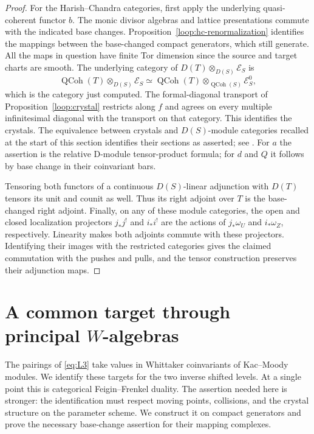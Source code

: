\documentclass[11pt]{article}
\numberwithin{equation}{section}
\theoremstyle{definition}
\theoremstyle{remark}
\begin{document}
\begin{proof}
For the Harish--Chandra categories, first apply the underlying
quasi-coherent functor $b$.  The monic divisor algebras and lattice
presentations commute with the indicated base changes.
Proposition~\ref{loop:hc-renormalization} identifies the mappings
between the base-changed compact generators, which still generate.
All the maps in question have finite Tor dimension since the source
and target charts are smooth.  The underlying category of
$D(T)\otimes_{D(S)}\mathcal E_S$ is
\[
 \operatorname{QCoh}(T)\otimes_{D(S)}\mathcal E_S
 \simeq\operatorname{QCoh}(T)\otimes_{\operatorname{QCoh}(S)}
                   \mathcal E_S^0,
\]
which is the category just computed.  The formal-diagonal transport
of Proposition~\ref{loop:crystal} restricts along $f$ and agrees on
every multiple infinitesimal diagonal with the transport on that
category.  This identifies the crystals.  The equivalence between
crystals and $D(S)$-module categories recalled at the start of this
section identifies their sections as asserted; see
\cite[Theorem~2.6.3 and Lemma~3.2.4]{Gaitsgory1Affine}.
For $a$ the assertion is the relative D-module tensor-product formula;
for $d$ and $Q$ it follows by base change in their coinvariant bars.

Tensoring both functors of a continuous $D(S)$-linear adjunction with
$D(T)$ tensors its unit and counit as well.  Thus its right adjoint
over $T$ is the base-changed right adjoint.  Finally, on any of these
module categories, the open and closed localization projectors
$j_*j^!$ and $i_*i^!$ are the actions of $j_*\omega_U$ and
$i_*\omega_Z$, respectively.  Linearity makes both adjoints commute with these
projectors.  Identifying their images with the restricted categories
gives the claimed commutation with the pushes and pulls, and the
tensor construction preserves their adjunction maps.
\end{proof}

\section{A common target through principal \texorpdfstring{\(W\)}{W}-algebras}\label{sec:walg}

The pairings of \eqref{eq:L3} take values in Whittaker coinvariants of
Kac--Moody modules.  We identify these targets for the two inverse shifted
levels.  At a single point this is categorical Feigin--Frenkel duality.
The assertion needed here is stronger: the identification must respect
moving points, collisions, and the crystal structure on the parameter
scheme.  We construct it on compact generators and prove the necessary
base-change assertion for their mapping complexes.
\end{document}
